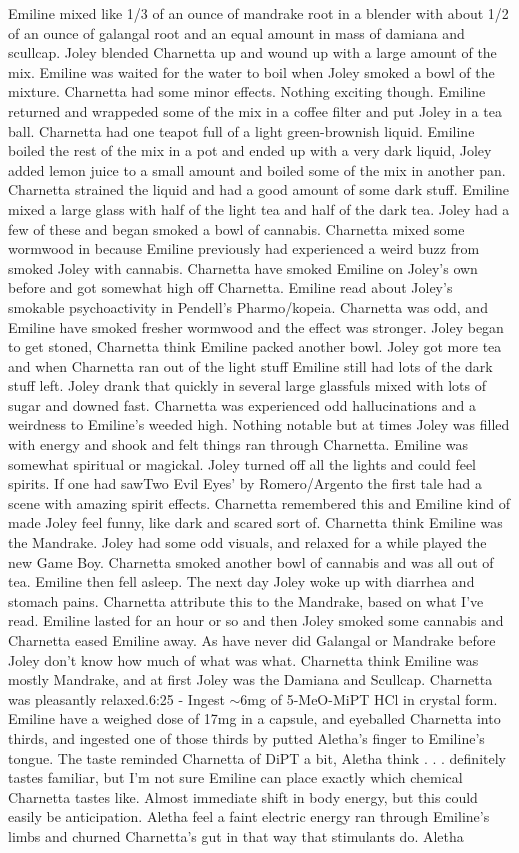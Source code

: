 \documentclass[12pt]{book}
\begin{document}
Emiline mixed like 1/3 of an ounce of mandrake root in a blender with about 1/2 of an ounce of galangal root and an equal amount in mass of damiana and scullcap. Joley blended Charnetta up and wound up with a large amount of the mix. Emiline was waited for the water to boil when Joley smoked a bowl of the mixture. Charnetta had some minor effects. Nothing exciting though. Emiline returned and wrappeded some of the mix in a coffee filter and put Joley in a tea ball. Charnetta had one teapot full of a light green-brownish liquid. Emiline boiled the rest of the mix in a pot and ended up with a very dark liquid, Joley added lemon juice to a small amount and boiled some of the mix in another pan. Charnetta strained the liquid and had a good amount of some dark stuff. Emiline mixed a large glass with half of the light tea and half of the dark tea. Joley had a few of these and began smoked a bowl of cannabis. Charnetta mixed some wormwood in because Emiline previously had experienced a weird buzz from smoked Joley with cannabis. Charnetta have smoked Emiline on Joley's own before and got somewhat high off Charnetta. Emiline read about Joley's smokable psychoactivity in Pendell's Pharmo/kopeia. Charnetta was odd, and Emiline have smoked fresher wormwood and the effect was stronger. Joley began to get stoned, Charnetta think Emiline packed another bowl. Joley got more tea and when Charnetta ran out of the light stuff Emiline still had lots of the dark stuff left. Joley drank that quickly in several large glassfuls mixed with lots of sugar and downed fast. Charnetta was experienced odd hallucinations and a weirdness to Emiline's weeded high. Nothing notable but at times Joley was filled with energy and shook and felt things ran through Charnetta. Emiline was somewhat spiritual or magickal. Joley turned off all the lights and could feel spirits. If one had sawTwo Evil Eyes' by Romero/Argento the first tale had a scene with amazing spirit effects. Charnetta remembered this and Emiline kind of made Joley feel funny, like dark and scared sort of. Charnetta think Emiline was the Mandrake. Joley had some odd visuals, and relaxed for a while played the new Game Boy. Charnetta smoked another bowl of cannabis and was all out of tea. Emiline then fell asleep. The next day Joley woke up with diarrhea and stomach pains. Charnetta attribute this to the Mandrake, based on what I've read. Emiline lasted for an hour or so and then Joley smoked some cannabis and Charnetta eased Emiline away. As have never did Galangal or Mandrake before Joley don't know how much of what was what. Charnetta think Emiline was mostly Mandrake, and at first Joley was the Damiana and Scullcap. Charnetta was pleasantly relaxed.6:25 - Ingest $\sim$6mg of 5-MeO-MiPT HCl in crystal form. Emiline have a weighed dose of 17mg in a capsule, and eyeballed Charnetta into thirds, and ingested one of those thirds by putted Aletha's finger to Emiline's tongue. The taste reminded Charnetta of DiPT a bit, Aletha think . . .  definitely tastes familiar, but I'm not sure Emiline can place exactly which chemical Charnetta tastes like. Almost immediate shift in body energy, but this could easily be anticipation. Aletha feel a faint electric energy ran through Emiline's limbs and churned Charnetta's gut in that way that stimulants do. Aletha 
\end{document}
